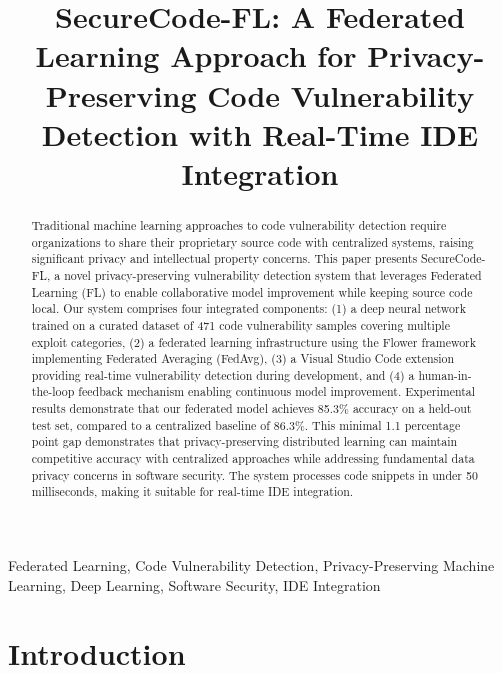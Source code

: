 \documentclass[conference]{IEEEtran}
\begin{document}
\title{SecureCode-FL: A Federated Learning Approach for Privacy-Preserving Code Vulnerability Detection with Real-Time IDE Integration}

\author{
}

\maketitle

\begin{abstract}
Traditional machine learning approaches to code vulnerability detection require organizations to share their proprietary source code with centralized systems, raising significant privacy and intellectual property concerns. This paper presents SecureCode-FL, a novel privacy-preserving vulnerability detection system that leverages Federated Learning (FL) to enable collaborative model improvement while keeping source code local. Our system comprises four integrated components: (1) a deep neural network trained on a curated dataset of 471 code vulnerability samples covering multiple exploit categories, (2) a federated learning infrastructure using the Flower framework implementing Federated Averaging (FedAvg), (3) a Visual Studio Code extension providing real-time vulnerability detection during development, and (4) a human-in-the-loop feedback mechanism enabling continuous model improvement. Experimental results demonstrate that our federated model achieves 85.3\% accuracy on a held-out test set, compared to a centralized baseline of 86.3\%. This minimal 1.1 percentage point gap demonstrates that privacy-preserving distributed learning can maintain competitive accuracy with centralized approaches while addressing fundamental data privacy concerns in software security. The system processes code snippets in under 50 milliseconds, making it suitable for real-time IDE integration.
\end{abstract}

\begin{IEEEkeywords}
Federated Learning, Code Vulnerability Detection, Privacy-Preserving Machine Learning, Deep Learning, Software Security, IDE Integration
\end{IEEEkeywords}

\section{Introduction}
\end{document}
